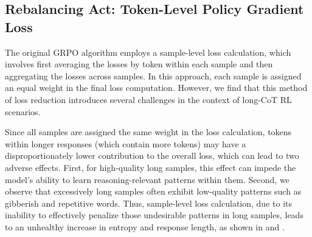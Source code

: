 

\subsection{Rebalancing Act: Token-Level Policy Gradient Loss}
\label{sec:tokenlevel}

The original GRPO algorithm employs a sample-level loss calculation, which involves first averaging the losses by token within each sample and then aggregating the losses across samples. In this approach, each sample is assigned an equal weight in the final loss computation. However, we find that this method of loss reduction introduces several challenges in the context of long-CoT RL scenarios.

Since all samples are assigned the same weight in the loss calculation,  tokens within longer responses (which contain more tokens) may have a disproportionately lower contribution to the overall loss, which can lead to two adverse effects.
First, for high-quality long samples, this effect can impede the model's ability to learn reasoning-relevant patterns within them.
Second, we observe that excessively long samples often exhibit low-quality patterns such as gibberish and repetitive words. Thus, sample-level loss calculation, due to its inability to effectively penalize those undesirable patterns in long samples, leads to an unhealthy increase in entropy and response length, as shown in 
 and .

